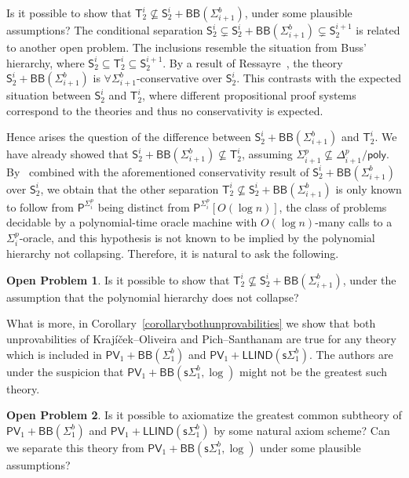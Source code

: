 \documentclass[11pt]{article}
\newcommand{\poly}{\mathsf{poly}}
\renewcommand{\P}{\mathsf{P}}
\newcommand{\PV}{\mathsf{PV}}
\theoremstyle{definition}
\newtheorem*{problem}{Open Problem}
\theoremstyle{definition}
\theoremstyle{remark}
\begin{document}
    Is it possible to show that $\mathsf{T}^i_2\not \subseteq\mathsf{S}^i_2+\mathsf{BB}(\Sigma^b_{i+1})$, under some plausible assumptions?
The conditional separation $\mathsf{S}^i_2\subsetneq \mathsf{S}^{i}_2 +\mathsf{BB}(\Sigma^b_{i+1}) \subsetneq \mathsf{S}^{i+1}_2$ is related to another open problem. The inclusions resemble the situation from Buss' hierarchy, where $\mathsf{S}^i_2\subseteq \mathsf{T}^i_2 \subseteq \mathsf{S}^{i+1}_2$. By a result of Ressayre~\cite{ressayre1986conservation}, the theory $\mathsf{S}^{i}_2 +\mathsf{BB}(\Sigma^b_{i+1})$ is $\forall\Sigma^b_{i+1}$-conservative over $\mathsf{S}^i_2$. This contrasts with the expected situation between $\mathsf{S}^i_2$ and $\mathsf{T}^i_2$, where different propositional proof systems correspond to the theories and thus no conservativity is expected. 

Hence arises the question of the difference between $\mathsf{S}^i_2+\mathsf{BB}(\Sigma^b_{i+1})$ and $\mathsf{T}^i_2$. We have already showed that $\mathsf{S}^i_2+\mathsf{BB}(\Sigma^b_{i+1})\not \subseteq \mathsf{T}^i_2$, assuming $\Sigma^p_{i+1}\not\subseteq\Delta^p_{i+1}/\poly$. By~\cite{krajivcek1993fragments} combined with the aforementioned conservativity result of $\mathsf{S}^i_2+\mathsf{BB}(\Sigma^b_{i+1})$ over $\mathsf{S}^i_2$, we obtain that the other separation $\mathsf{T}^i_2\not \subseteq\mathsf{S}^i_2+\mathsf{BB}(\Sigma^b_{i+1})$ is only known to follow from $\P^{\Sigma^p_i}$ being distinct from $\P^{\Sigma^p_i}[O(\log n)]$, the class of problems decidable by a polynomial-time oracle machine with $O(\log n)$-many calls to a $\Sigma^p_i$-oracle, and this hypothesis is not known to be implied by the polynomial hierarchy not collapsing. Therefore, it is natural to ask the following.

\begin{problem}
    Is it possible to show that $\mathsf{T}^i_2\not \subseteq\mathsf{S}^i_2+\mathsf{BB}(\Sigma^b_{i+1})$, under the assumption that the polynomial hierarchy does not collapse?
\end{problem}

What is more, in Corollary~\ref{corollarybothunprovabilities} we show that both unprovabilities of Krajíček--Oliveira and Pich--Santhanam are true for any theory which is included in $\PV_1+\mathsf{BB}(\Sigma^b_1)$ and $\PV_1+\mathsf{LLIND}(\mathsf{s}\Sigma^b_1)$. The authors are under the suspicion that $\PV_1+\mathsf{BB}(\mathsf{s}\Sigma^b_1,\log)$ might not be the greatest such theory.

\begin{problem}
    Is it possible to axiomatize the greatest common subtheory of $\PV_1+\mathsf{BB}(\Sigma^b_1)$ and $\PV_1+\mathsf{LLIND}(\mathsf{s}\Sigma^b_1)$ by some natural axiom scheme? Can we separate this theory from $\PV_1+\mathsf{BB}(\mathsf{s}\Sigma^b_1,\log)$ under some plausible assumptions?
\end{problem}
\end{document}

